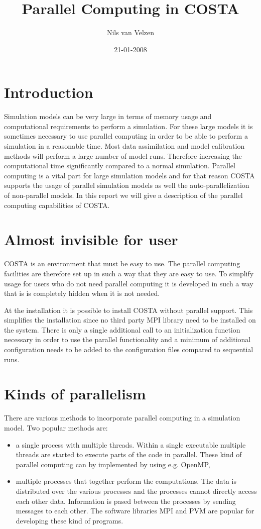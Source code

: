 \documentclass[a4paper,12pt]{article}
\title{Parallel Computing in COSTA}
\author{Nils van Velzen}
\date{21-01-2008}
\begin{document}
\memotitlepage

\section{Introduction}
Simulation models can be very large in terms of memory usage and
computational requirements to perform a simulation.  For these large models
it is sometimes necessary to use parallel computing in order to be able to
perform a simulation in a reasonable time.  Most data assimilation and
model calibration methods will perform a large number of model runs.
Therefore increasing the computational time significantly compared to a
normal simulation.  Parallel computing is a vital part for large simulation
models and for that reason COSTA supports the usage of parallel simulation
models as well the auto-parallelization of non-parallel models.  In this
report we will give a description of the parallel computing capabilities of
COSTA.

\section{Almost invisible for user}
COSTA is an environment that must be easy to use. The parallel computing
facilities are therefore set up in such a way that they are easy to use.
To simplify usage for users who do not need parallel computing it is 
developed in such a way that is is completely hidden when it is not needed.

At the installation it is possible to install COSTA without parallel
support. This simplifies the installation since no third party MPI library
need to be installed on the system. There is only a single additional call
to an initialization function necessary in order to use the parallel
functionality and a minimum of additional configuration needs to be added
to the configuration files compared to sequential runs.

\section{Kinds of parallelism}
There are various methods to incorporate parallel computing in a simulation
model. Two popular methods are:
\begin{itemize}
\item a single process with multiple threads. Within a single executable
      multiple threads are started to execute parts of the
      code in parallel. These kind of parallel computing can by implemented
      by using e.g. OpenMP,
\item multiple processes that together perform the computations. The data
      is distributed over the various processes and the processes cannot
      directly access each other data. Information is pased between the
      processes by sending messages to each other.  The software libraries
      MPI and PVM are popular for developing these kind of programs.
\end{itemize}
\end{document}
